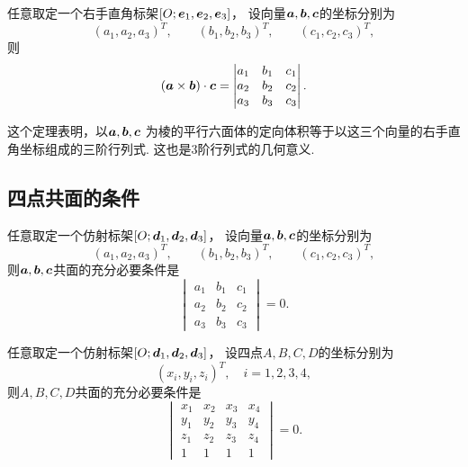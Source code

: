 \begin{theorem}
任意取定一个右手直角标架\([O;\boldsymbol{e}_1,\boldsymbol{e}_2,\boldsymbol{e}_3]\)，
设向量\(\boldsymbol{a},\boldsymbol{b},\boldsymbol{c}\)的坐标分别为\begin{equation*}
	(a_1,a_2,a_3)^T, \qquad
	(b_1,b_2,b_3)^T, \qquad
	(c_1,c_2,c_3)^T,
\end{equation*}
则\begin{equation}
	(\boldsymbol{a}\times\boldsymbol{b})\cdot\boldsymbol{c}
	= \begin{vmatrix}
		a_1 & b_1 & c_1 \\
		a_2 & b_2 & c_2 \\
		a_3 & b_3 & c_3
	\end{vmatrix}.
\end{equation}
\end{theorem}
这个定理表明，以\(\boldsymbol{a},\boldsymbol{b},\boldsymbol{c}\)
为棱的平行六面体的定向体积等于以这三个向量的右手直角坐标组成的三阶行列式.
这也是3阶行列式的几何意义.

\subsection{四点共面的条件}
\begin{theorem}
任意取定一个仿射标架\([O;\boldsymbol{d}_1,\boldsymbol{d}_2,\boldsymbol{d}_3]\)，
设向量\(\boldsymbol{a},\boldsymbol{b},\boldsymbol{c}\)的坐标分别为\begin{equation*}
	(a_1,a_2,a_3)^T, \qquad
	(b_1,b_2,b_3)^T, \qquad
	(c_1,c_2,c_3)^T,
\end{equation*}
则\(\boldsymbol{a},\boldsymbol{b},\boldsymbol{c}\)共面的充分必要条件是\begin{equation*}
	\begin{vmatrix}
		a_1 & b_1 & c_1 \\
		a_2 & b_2 & c_2 \\
		a_3 & b_3 & c_3
	\end{vmatrix} = 0.
\end{equation*}
\end{theorem}

\begin{corollary}
任意取定一个仿射标架\([O;\boldsymbol{d}_1,\boldsymbol{d}_2,\boldsymbol{d}_3]\)，
设四点\(A,B,C,D\)的坐标分别为\begin{equation*}
	(x_i,y_i,z_i)^T,
	\quad i=1,2,3,4,
\end{equation*}
则\(A,B,C,D\)共面的充分必要条件是\begin{equation*}
	\begin{vmatrix}
		x_1 & x_2 & x_3 & x_4 \\
		y_1 & y_2 & y_3 & y_4 \\
		z_1 & z_2 & z_3 & z_4 \\
		1 & 1 & 1 & 1
	\end{vmatrix} = 0.
\end{equation*}
\end{corollary}

